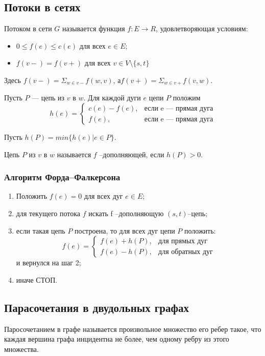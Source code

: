 \subsection{Потоки в сетях}

Потоком в сети $G$ называется функция $f : E \rightarrow R$, удовлетворяющая условиям:
\begin{itemize}
	\item $0 \le f (e) \le c(e)$ для всех $e \in E$;
	\item $f (v −) = f (v +)$ для всех $v \in V \setminus \{s , t \}$
\end{itemize}
Здесь $f(v−)=\Sigma_{w \in v−}   f(w,v)$, а$f(v+)=\Sigma_{w \in v+}   f(v,w)$.


Пусть $P$ — цепь из $v$ в $w$. Для каждой дуги $e$ цепи $P$ положим
\begin{equation}
	h(e) = \begin{cases} c(e) − f (e) , & \mbox{если e — прямая дуга} \\ f (e), & \mbox{если e — прямая дуга} \end{cases}
\end{equation}

Пусть $h(P) = min\{h(e)|e \in  P\}$.

Цепь $P$ из $v$ в $w$ называется $f$ –дополняющей, если $h(P) > 0$.

\subsubsection{Алгоритм Форда–Фалкерсона}

\begin{enumerate}
	\item Положить $f (e) = 0$ для всех дуг $e \in E$;
	\item для текущего потока $f$ искать f –дополняющую $(s, t)$–цепь;
	\item если такая цепь $P$ построена, то для всех дуг цепи $P$ положить: \begin{equation}
		f(e) = \begin{cases} f (e) + h(P) , & \mbox{для прямых дуг} \\ f (e) - h(P), & \mbox{для обратных дуг} \end{cases}
	\end{equation}
	и вернулся на шаг 2;
	\item иначе СТОП.
\end{enumerate}


\subsection{Парасочетания в двудольных графах}
Паросочетанием в графе называется произвольное множество его ребер такое, что каждая вершина графа инцидентна не более, чем одному ребру из этого множества.

